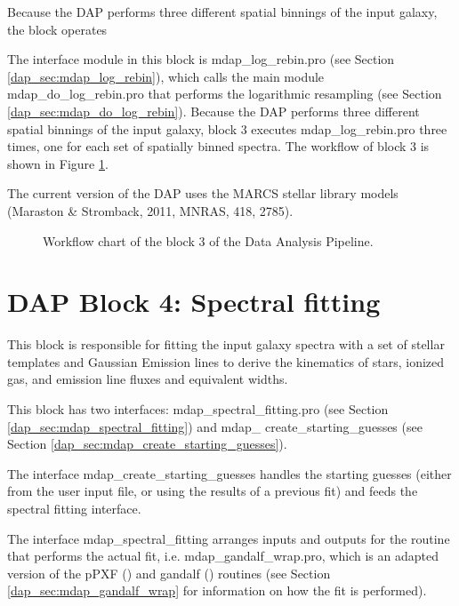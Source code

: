 \documentclass[11pt]{book}
\begin{document}
Because the DAP performs three different spatial binnings of the input
galaxy, the block operates

The interface module in this block is mdap\_log\_rebin.pro (see
Section \ref{dap_sec:mdap_log_rebin}), which calls the main module
mdap\_do\_log\_rebin.pro that performs the logarithmic resampling (see
Section \ref{dap_sec:mdap_do_log_rebin}). Because the DAP performs
three different spatial binnings of the input galaxy, block 3 executes
mdap\_log\_rebin.pro three times, one for each set of spatially binned
spectra. The workflow of block 3 is shown in Figure
\ref{dap_fig:block3}.

The current version of the DAP uses the MARCS stellar library models
(Maraston \& Stromback, 2011, MNRAS, 418, 2785).

\begin{figure}
\begin{center}
\caption{Workflow chart of the block 3 of the Data Analysis
  Pipeline.}
 \label{dap_fig:block3}
\end{center}
\end{figure}



\section[DAP Block 4: Spectral fitting]{DAP Block 4: Spectral fitting}

This block is responsible for fitting the input galaxy spectra with a
set of stellar templates and Gaussian Emission lines to derive the
kinematics of stars, ionized gas, and emission line fluxes and
equivalent widths.

This block has two interfaces: mdap\_spectral\_fitting.pro (see
Section \ref{dap_sec:mdap_spectral_fitting}) and
mdap\_ create\_starting\_guesses (see Section
\ref{dap_sec:mdap_create_starting_guesses}).


The interface mdap\_create\_starting\_guesses handles the starting
guesses (either from the user input file, or using the results of a
previous fit) and feeds the spectral fitting interface.


The interface mdap\_spectral\_fitting arranges inputs and outputs for
the routine that performs the actual fit, i.e.
mdap\_gandalf\_wrap.pro, which is an adapted version of the pPXF
(\citealt{Cappellari+04}) and gandalf (\citealt{Sarzi+06}) routines
(see Section \ref{dap_sec:mdap_gandalf_wrap} for information on how
the fit is performed). 
\end{document}
